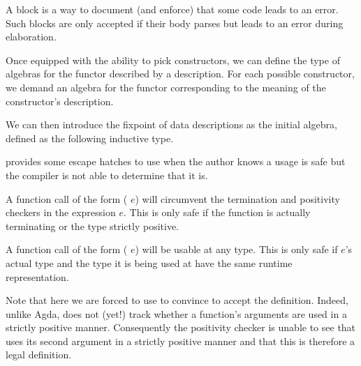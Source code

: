 \noindent
\begin{minipage}[t]{0.35\textwidth}
\end{minipage}\hfill
\begin{minipage}[t]{0.42\textwidth}
\end{minipage}

\begin{remark}
  A  block is a way to document (and
  enforce) that some code leads to an error.
  Such blocks are only accepted if their body parses but
  leads to an error during elaboration.
\end{remark}

Once equipped with the ability to pick constructors, we can define
the type of algebras for the functor described by a 
description. For each possible constructor, we demand an algebra for
the functor corresponding to the meaning of the  constructor's description.


We can then introduce the fixpoint of data descriptions as the initial
algebra, defined as the following inductive type.


\begin{remark}
  \idris{} provides some escape hatches to use when the author
  knows a usage is safe but the compiler is not able to
  determine that it is.

  A function call of the form (\assertTotal{} $e$) will
  circumvent the termination and positivity checkers in
  the expression $e$.
  This is only safe if the function is actually terminating
  or the type strictly positive.

  A function call of the form (\believeMe{} $e$) will be
  usable at any type. This is only safe if $e$'s actual type
  and the type it is being used at have the same runtime
  representation.
\end{remark}

Note that here we are forced to use \assertTotal{} to convince \idris{}
to accept the definition.
%
Indeed, unlike Agda, \idris{} does not (yet!) track whether a function's
arguments are used in a strictly positive manner.
%
Consequently the positivity checker
is unable to see that  uses its second
argument in a strictly positive manner
and that this is therefore a legal definition.

